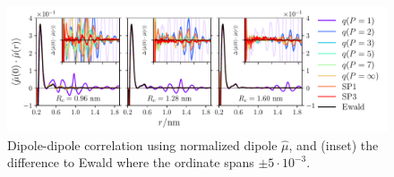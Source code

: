 \documentclass[
journal=jctcce,
manuscript=letter]{achemso}
\begin{document}
\begin{figure}[!t]
    \centering
    \includegraphics[width=1.0\columnwidth]{spce_mumu_diff.pdf}
    \caption{Dipole-dipole correlation using normalized dipole $\hat{\mu}$, and (inset) the difference to Ewald where the ordinate spans $\pm 5\cdot 10^{-3}$.}
    \label{fig:mumu}
\end{figure}
\end{document}
